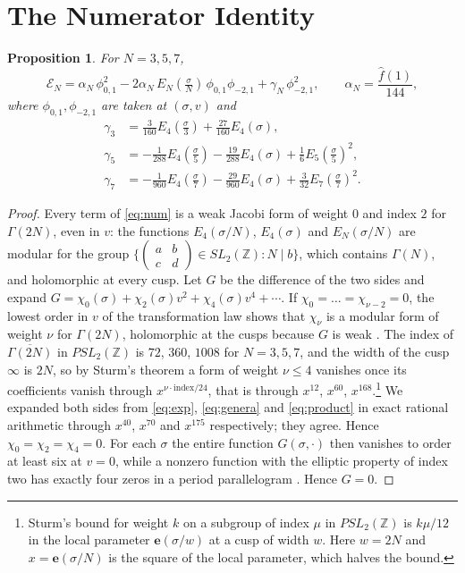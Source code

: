 \documentclass[mathematics,article,submit,pdftex,oneauthor]{Definitions/mdpi}
\numberwithin{equation}{section}
\theoremstyle{plain}
\newtheorem{prop}[thm]{Proposition}
\theoremstyle{remark}
\newcommand{\Z}{\mathbb{Z}}
\newcommand{\cE}{\mathcal{E}}
\newcommand{\e}{\mathbf{e}}
\newcommand{\pmi}{\phi_{-2,1}}
\newcommand{\pz}{\phi_{0,1}}
\begin{document}
\section{The Numerator Identity}\label{sec:num}

\begin{prop}\label{prop:num}
For $N=3,5,7$,
\begin{equation}\label{eq:num}
\cE_N=\alpha_N\,\pz^2-2\alpha_N\,E_N(\tfrac\sigma N)\,\pz\pmi+\gamma_N\,\pmi^2,\qquad \alpha_N=\frac{\hat f(1)}{144},
\end{equation}
where $\pz,\pmi$ are taken at $(\sigma,v)$ and
\begin{align*}
\gamma_3&=\tfrac{3}{160}E_4(\tfrac\sigma3)+\tfrac{27}{160}E_4(\sigma),\\
\gamma_5&=-\tfrac{1}{288}E_4(\tfrac\sigma5)-\tfrac{19}{288}E_4(\sigma)+\tfrac16E_5(\tfrac\sigma5)^2,\\
\gamma_7&=-\tfrac{1}{960}E_4(\tfrac\sigma7)-\tfrac{29}{960}E_4(\sigma)+\tfrac{3}{32}E_7(\tfrac\sigma7)^2.
\end{align*}
\end{prop}

\begin{proof}
Every term of \eqref{eq:num} is a weak Jacobi form of weight $0$ and index $2$ for $\Gamma(2N)$, even in $v$: the functions $E_4(\sigma/N)$, $E_4(\sigma)$ and $E_N(\sigma/N)$ are modular for the group $\{\left(\begin{smallmatrix}a&b\\c&d\end{smallmatrix}\right)\in SL_2(\Z):N\mid b\}$, which contains $\Gamma(N)$, and holomorphic at every cusp. Let $G$ be the difference of the two sides and expand $G=\chi_0(\sigma)+\chi_2(\sigma)v^2+\chi_4(\sigma)v^4+\cdots$. If $\chi_0=\dots=\chi_{\nu-2}=0$, the lowest order in $v$ of the transformation law shows that $\chi_\nu$ is a modular form of weight $\nu$ for $\Gamma(2N)$, holomorphic at the cusps because $G$ is weak \cite[\S3]{EZ85}. The index of $\overline{\Gamma(2N)}$ in $PSL_2(\Z)$ is $72$, $360$, $1008$ for $N=3,5,7$, and the width of the cusp $\infty$ is $2N$, so by Sturm's theorem \cite{Stu87} a form of weight $\nu\le4$ vanishes once its coefficients vanish through $x^{\nu\cdot\mathrm{index}/24}$, that is through $x^{12}$, $x^{60}$, $x^{168}$.\footnote{Sturm's bound for weight $k$ on a subgroup of index $\mu$ in $PSL_2(\Z)$ is $k\mu/12$ in the local parameter $\e(\sigma/w)$ at a cusp of width $w$. Here $w=2N$ and $x=\e(\sigma/N)$ is the square of the local parameter, which halves the bound.} We expanded both sides from \eqref{eq:exp}, \eqref{eq:genera} and \eqref{eq:product} in exact rational arithmetic through $x^{40}$, $x^{70}$ and $x^{175}$ respectively; they agree. Hence $\chi_0=\chi_2=\chi_4=0$. For each $\sigma$ the entire function $G(\sigma,\cdot)$ then vanishes to order at least six at $v=0$, while a nonzero function with the elliptic property of index two has exactly four zeros in a period parallelogram \cite[Theorem~1.2]{EZ85}. Hence $G=0$.
\end{proof}
\end{document}
